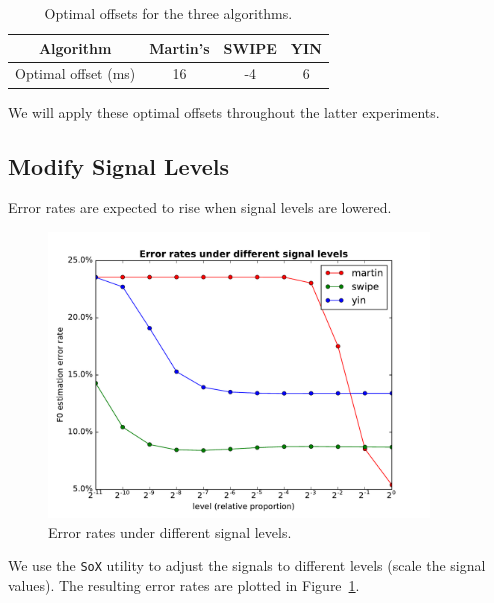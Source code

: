 \documentclass[11pt,a4paper,titlepage]{article}
\begin{document}
\begin{table}[htbp]
  \centering
  \begin{tabular}{cccc}
  	\toprule
  	             Algorithm              & Martin's & SWIPE & YIN \\
  	\midrule
  	Optimal offset (\si{\milli\second}) &    16    &  -4   &  6  \\
  	\bottomrule
  \end{tabular}
  \caption{Optimal offsets for the three algorithms.} \label{tab:offsets}
\end{table}

We will apply these optimal offsets throughout the latter experiments.

\newpage

\subsection{Modify Signal Levels}

Error rates are expected to rise when signal levels are lowered.

\begin{figure}[htbp]
  \centering
  \includegraphics[width=0.9\textwidth]{error_rates_vs_signal_levels.pdf}
  \caption{Error rates under different signal levels.} \label{fig:levels}
\end{figure}

We use the \texttt{SoX} utility to adjust the signals to different levels (scale the signal values).
The resulting error rates are plotted in Figure~\ref{fig:levels}.
\end{document}
